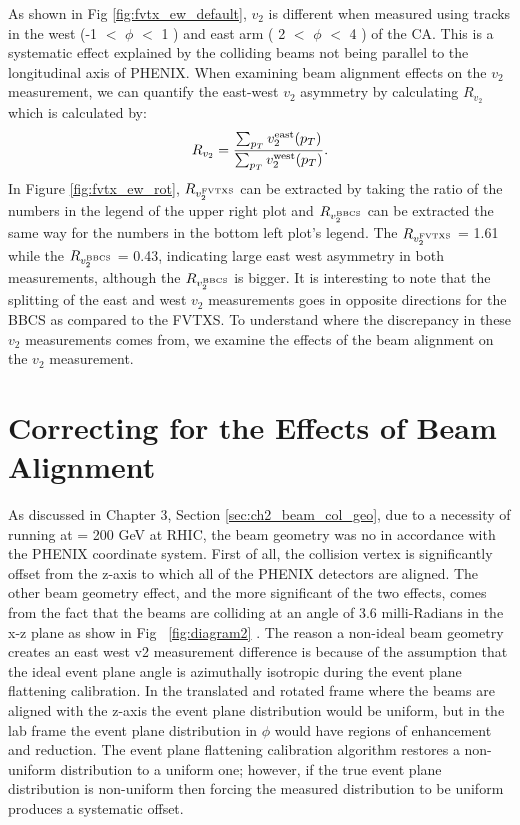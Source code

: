 As shown in Fig \ref{fig:fvtx_ew_default}, $v_2$ is different when measured using tracks in the west (-1 $<$ $\phi$ $<$ 1 ) and east arm ( 2 $<$ $\phi$ $<$ 4 ) of the CA. This is a systematic effect explained by the colliding beams not being parallel to the longitudinal axis of PHENIX. When examining beam alignment effects on the $v_2$ measurement, we can quantify the east-west $v_2$ asymmetry by calculating $R_{v_2}$ which is calculated by: 
\begin{equation}
R_{v_2} = \frac{\sum_{p_T}{v_2^{\rm east}(p_T)}}{\sum_{p_T}{v_2^{\rm west}(p_T)}}.
\end{equation}
In Figure \ref{fig:fvtx_ew_rot}, $R_{v_2^{\rm FVTXS}}$ can be extracted by taking the ratio of the numbers in the legend of the upper right plot and $R_{v_2^{\rm BBCS}}$ can be extracted the same way for the numbers in the bottom left plot's legend. The $R_{v_2^{\rm FVTXS}}$ = 1.61 while the $R_{v_2^{\rm BBCS}}$ = 0.43, indicating large east west asymmetry in both measurements, although the $R_{v_2^{\rm BBCS}}$ is bigger. It is interesting to note that the splitting of the east and west $v_2$ measurements goes in opposite directions for the BBCS as compared to the FVTXS. To understand where the discrepancy in these $v_2$ measurements comes from, we examine the effects of the beam alignment on the $v_2$ measurement.
\section{Correcting for the Effects of Beam Alignment}
As discussed in Chapter 3, Section \ref{sec:ch2_beam_col_geo}, due to a necessity of running \pau at \sqsn = 200 GeV at RHIC, the beam geometry was no in accordance with the PHENIX coordinate system. First of all, the collision vertex is significantly offset from the z-axis to which all of the PHENIX detectors are aligned. The other beam geometry effect, and the more significant of the two effects, comes from the fact that the beams are colliding at an angle of 3.6 milli-Radians in the x-z plane as show in Fig ~\ref{fig:diagram2} \cite{BNL_Run15_Operations}. The reason a non-ideal beam geometry creates an east west v2 measurement difference is because of the assumption that the ideal event plane angle is azimuthally isotropic during the event plane flattening calibration. In the translated and rotated frame where the beams are aligned with the z-axis the event plane distribution would be uniform, but in the lab frame the event plane distribution in $\phi$ would have regions of enhancement and reduction. The event plane flattening calibration algorithm restores a non-uniform distribution to a uniform one; however, if the true event plane distribution is non-uniform then forcing the measured distribution to be uniform produces a systematic offset.


